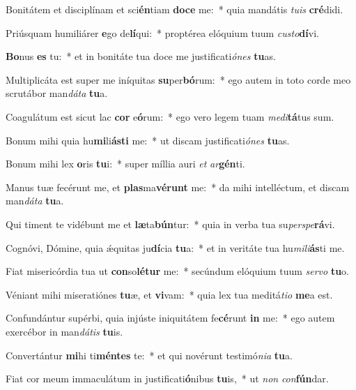 \item Bonitátem et disciplínam et sci\textbf{én}tiam \textbf{do}\textbf{ce} me:~* quia mandátis \textit{tu}\textit{is} \textbf{cré}didi.
\item Priúsquam humiliárer \textbf{e}go de\textbf{lí}qui:~* proptérea elóquium tuum \textit{cus}\textit{to}\textbf{dí}vi.
\item \textbf{Bo}nus \textbf{es} tu:~* et in bonitáte tua doce me justificati\textit{ó}\textit{nes} \textbf{tu}as.
\item Multiplicáta est super me iníquitas \textbf{su}per\textbf{bó}rum:~* ego autem in toto corde meo scrutábor man\textit{dá}\textit{ta} \textbf{tu}a.
\item Coagulátum est sicut lac \textbf{cor} e\textbf{ó}rum:~* ego vero legem tuam \textit{me}\textit{di}\textbf{tá}tus sum.
\item Bonum mihi quia hu\textbf{mi}li\textbf{ás}\textbf{ti} me:~* ut discam justificati\textit{ó}\textit{nes} \textbf{tu}as.
\item Bonum mihi lex \textbf{o}ris \textbf{tu}i:~* super míllia auri \textit{et} \textit{ar}\textbf{gén}ti.
\item Manus tuæ fecérunt me, et \textbf{plas}ma\textbf{vé}\textbf{runt} me:~* da mihi intelléctum, et discam man\textit{dá}\textit{ta} \textbf{tu}a.
\item Qui timent te vidébunt me et \textbf{læ}ta\textbf{bún}tur:~* quia in verba tua su\textit{per}\textit{spe}\textbf{rá}vi.
\item Cognóvi, Dómine, quia ǽquitas ju\textbf{dí}cia \textbf{tu}a:~* et in veritáte tua hu\textit{mi}\textit{li}\textbf{ás}ti me.
\item Fiat misericórdia tua ut \textbf{con}so\textbf{lé}\textbf{tur} me:~* secúndum elóquium tuum \textit{ser}\textit{vo} \textbf{tu}o.
\item Véniant mihi miseratiónes \textbf{tu}æ, et \textbf{vi}vam:~* quia lex tua meditá\textit{ti}\textit{o} \textbf{me}a est.
\item Confundántur supérbi, quia injúste iniquitátem fe\textbf{cé}runt \textbf{in} me:~* ego autem exercébor in man\textit{dá}\textit{tis} \textbf{tu}is.
\item Convertántur \textbf{mi}hi ti\textbf{mén}\textbf{tes} te:~* et qui novérunt testimó\textit{ni}\textit{a} \textbf{tu}a.
\item Fiat cor meum immaculátum in justificati\textbf{ó}nibus \textbf{tu}is,~* ut \textit{non} \textit{con}\textbf{fún}dar.

